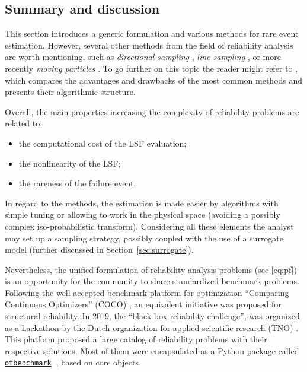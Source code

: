 \subsection{Summary and discussion}

This section introduces a generic formulation and various methods for rare event estimation. 
However, several other methods from the field of reliability analysis are worth mentioning, such as \textit{directional sampling} \citet{bjerager_1988_directional_sampling}, \textit{line sampling} \citep{koutsourelakis_2004_line_sampling}, or more recently \textit{moving particles} \citep{walter_2015_moving_particles}. 
To go further on this topic the reader might refer to \citet{MorioBalesdent2015}, which compares the advantages and drawbacks of the most common methods and presents their algorithmic structure. 

Overall, the main properties increasing the complexity of reliability problems are related to:
\begin{itemize}
    \item the computational cost of the LSF evaluation;
    \item the nonlinearity of the LSF;
    \item the rareness of the failure event.
\end{itemize} 
In regard to the methods, the estimation is made easier by algorithms with simple tuning or allowing to work in the physical space (avoiding a possibly complex iso-probabilistic transform).
Considering all these elements the analyst may set up a sampling strategy, possibly coupled with the use of a surrogate model (further discussed in Section~\ref{sec:surrogate}). 

Nevertheless, the unified formulation of reliability analysis problems (see \ref{eq:pf}) is an opportunity for the community to share standardized benchmark problems. 
Following the well-accepted benchmark platform for optimization ``Comparing Continuous Optimizers'' (COCO) \citep{hansen_2021_coco}, an equivalent initiative was proposed for structural reliability. 
In 2019, the ``black-box reliability challenge'', was organized as a hackathon by the Dutch organization for applied scientific research (TNO) \citep{rozsas_2019_bbrc}. 
This platform proposed a large catalog of reliability problems with their respective solutions. 
Most of them were encapsulated as a Python package called \href{https://github.com/mbaudin47/otbenchmark/}{\texttt{otbenchmark}}\footnotemark$~$ \citep{fekhari_baudin_2021}, based on core \ots objects.  


